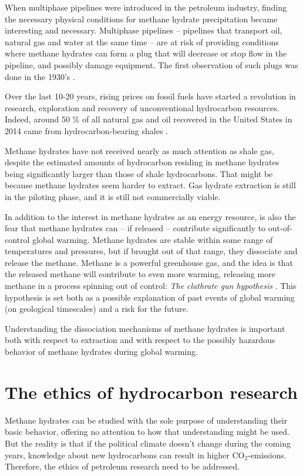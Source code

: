 When multiphase pipelines were introduced in the petroleum industry, finding the necessary physical conditions for methane hydrate precipitation became interesting and necessary. Multiphase pipelines -- pipelines that transport oil, natural gas and water at the same time -- are at risk of providing conditions where methane hydrates can form a plug that will decrease or stop flow in the pipeline, and possibly damage equipment. The first observation of such plugs was done in the 1930's \cite{Hammerschmidt1934}.

Over the last 10-20 years, rising prices on fossil fuels have started a revolution in research, exploration and recovery of unconventional hydrocarbon resources. Indeed, around 50 \% of all natural gas and oil recovered in the United States in 2014 came from hydrocarbon-bearing shales \cite{EIA2015}.

Methane hydrates have not received nearly as much attention as shale gas, despite the estimated amounts of hydrocarbon residing in methane hydrates being significantly larger than those of shale hydrocarbons. That might be because methane hydrates seem harder to extract. Gas hydrate extraction is still in the piloting phase, and it is still not commercially viable.

In addition to the interest in methane hydrates as an energy resource, is also the fear that methane hydrates can -- if released -- contribute significantly to out-of-control global warming. Methane hydrates are stable within some range of temperatures and pressures, but if brought out of that range, they dissociate and release the methane. Methane is a powerful greenhouse gas, and the idea is that the released methane will contribute to even more warming, releasing more methane in a process spinning out of control: \emph{The clathrate gun hypothesis} \cite{kennett2003methane}. This hypothesis is set both as a possible explanation of past events of global warming (on geological timescales) and a risk for the future.

Understanding the dissociation mechanisms of methane hydrates is important both with respect to extraction and with respect to the possibly hazardous behavior of methane hydrates during global warming. 

\section{The ethics of hydrocarbon research}
Methane hydrates can be studied with the sole purpose of understanding their basic behavior, offering no attention to how that understanding might be used. But the reality is that if the political climate doesn't change during the coming years, knowledge about new hydrocarbons can result in higher CO$_2$-emissions. Therefore, the ethics of petroleum research need to be addressed.

